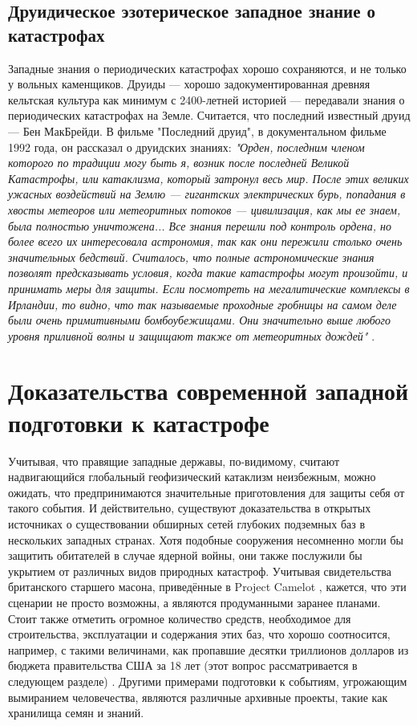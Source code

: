 \documentclass[10pt,twocolumn,letterpaper]{article}
\begin{document}
\subsection{Друидическое эзотерическое западное знание о катастрофах}

Западные знания о периодических катастрофах хорошо сохраняются, и не только у вольных каменщиков. Друиды — хорошо задокументированная древняя кельтская культура как минимум с 2400-летней историей \cite{7} — передавали знания о периодических катастрофах на Земле. Считается, что последний известный друид — Бен МакБрейди. В фильме "Последний друид", в документальном фильме 1992 года, он рассказал о друидских знаниях: \textit{"Орден, последним членом которого по традиции могу быть я, возник после последней Великой Катастрофы, или катаклизма, который затронул весь мир. После этих великих ужасных воздействий на Землю — гигантских электрических бурь, попадания в хвосты метеоров или метеоритных потоков — цивилизация, как мы ее знаем, была полностью уничтожена... Все знания перешли под контроль ордена, но более всего их интересовала астрономия, так как они пережили столько очень значительных бедствий. Считалось, что полные астрономические знания позволят предсказывать условия, когда такие катастрофы могут произойти, и принимать меры для защиты. Если посмотреть на мегалитические комплексы в Ирландии, то видно, что так называемые проходные гробницы на самом деле были очень примитивными бомбоубежищами. Они значительно выше любого уровня приливной волны и защищают также от метеоритных дождей"} \cite{8,9}.

\section{Доказательства современной западной подготовки к катастрофе}

Учитывая, что правящие западные державы, по-видимому, считают надвигающийся глобальный геофизический катаклизм неизбежным, можно ожидать, что предпринимаются значительные приготовления для защиты себя от такого события. И действительно, существуют доказательства в открытых источниках о существовании обширных сетей глубоких подземных баз в нескольких западных странах. Хотя подобные сооружения несомненно могли бы защитить обитателей в случае ядерной войны, они также послужили бы укрытием от различных видов природных катастроф. Учитывая свидетельства британского старшего масона, приведённые в Project Camelot \cite{4,6}, кажется, что эти сценарии не просто возможны, а являются продуманными заранее планами. Стоит также отметить огромное количество средств, необходимое для строительства, эксплуатации и содержания этих баз, что хорошо соотносится, например, с такими величинами, как пропавшие десятки триллионов долларов из бюджета правительства США за 18 лет (этот вопрос рассматривается в следующем разделе) \cite{11,12,13}. Другими примерами подготовки к событиям, угрожающим вымиранием человечества, являются различные архивные проекты, такие как хранилища семян и знаний.
\end{document}
